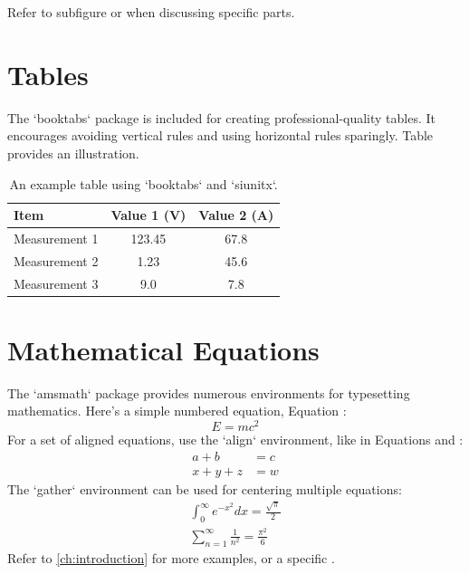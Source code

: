 Refer to subfigure  or  when discussing specific parts.

\section{Tables}
\label{sec:tables}

The `booktabs` package is included for creating professional-quality tables. It encourages avoiding vertical rules and using horizontal rules sparingly.
Table  provides an illustration.

\begin{table}[htbp]
    \centering
    \caption{An example table using `booktabs` and `siunitx`.}
    \label{tab:example_table_siunitx}
    \begin{tabular}{lS[table-format=3.2]S[table-format=2.1]}
        \toprule
        {Item} & {Value 1 (\si{\volt})} & {Value 2 (\si{\ampere})} \\
        \midrule
        Measurement 1 & 123.45 & 67.8 \\
        Measurement 2 & 1.23 & 45.6 \\
        Measurement 3 & 9.0 & 7.8 \\
        \bottomrule
    \end{tabular}
\end{table}

\section{Mathematical Equations}
\label{sec:equations}

The `amsmath` package provides numerous environments for typesetting mathematics.
Here's a simple numbered equation, Equation :
\begin{equation}
    E = mc^2
    \label{eq:einstein}
\end{equation}
For a set of aligned equations, use the `align` environment, like in Equations  and :
\begin{align}
    a + b &= c \label{eq:align_start} \\
    x + y + z &= w \label{eq:align_end}
\end{align}
The `gather` environment can be used for centering multiple equations:
\begin{gather}
    \int_0^\infty e^{-x^2} dx = \frac{\sqrt{\pi}}{2} \label{eq:gaussian_integral} \\
    \sum_{n=1}^\infty \frac{1}{n^2} = \frac{\pi^2}{6} \label{eq:basel_problem}
\end{gather}
Refer to \cref{ch:introduction} for more examples, or a specific .

